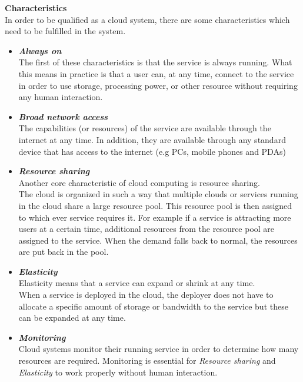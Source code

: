 \documentclass[12pt,a4paper]{article}
\begin{document}
\textbf{Characteristics}\\
In order to be qualified as a cloud system, there are some characteristics which need to be fulfilled in the system.
\begin{itemize}
\item \textbf{\emph{Always on}} \\
The first of these characteristics is that the service is always running. What this means in practice is that a user can, at any time, connect to the service in order to use storage, processing power, or other resource without requiring any human interaction.

\item \textbf{\emph{Broad network access}} \\
The capabilities (or resources) of the service are available through the internet at any time. In addition, they are available through any standard device that has access to the internet (e.g PCs, mobile phones and PDAs)

\item \textbf{\emph{Resource sharing}} \\
Another core characteristic of cloud computing is resource sharing.\\
The cloud is organized in such a way that multiple clouds or services running in the cloud share a large resource pool. This resource pool is then assigned to which ever service requires it. For example if a service is attracting more users at a certain time, additional resources from the resource pool are assigned to the service. When the demand falls back to normal, the resources are put back in the pool.

\item \textbf{\emph{Elasticity}} \\
Elasticity means that a service can expand or shrink at any time.\\
When a service is deployed in the cloud, the deployer does not have to allocate a specific amount of storage or bandwidth to the service but these can be expanded at any time.

\item \textbf{\emph{Monitoring}} \\
Cloud systems monitor their running service in order to determine how many resources are required. Monitoring is essential for \emph{Resource sharing} and \emph{Elasticity} to work properly without human interaction.
\end{itemize}
\end{document}
